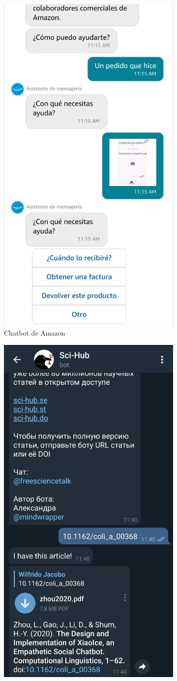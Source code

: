 \begin{figure}[h]
	\centering
	\begin{subfigure}{0.45\linewidth}
		\centering
		\includegraphics[width=0.45\linewidth]{img/chatbotamazon2}
		\caption{Chatbot de Amazon}
		\label{fig:chatbotamazon}
	\end{subfigure}
	\begin{subfigure}{0.45\linewidth}
		\centering
		\includegraphics[width=0.45\linewidth]{img/chabotscihub}

\end{subfigure}
\end{figure}
